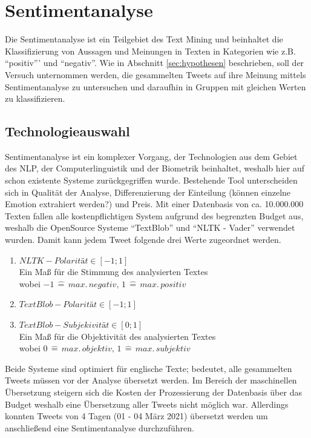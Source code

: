 \chapter{Sentimentanalyse}
\label{chap:sentiment}
Die Sentimentanalyse ist ein Teilgebiet des \gls{Text Mining} und beinhaltet die Klassifizierung von Aussagen und Meinungen in Texten in Kategorien wie z.B. "`positiv"'' und "`negativ"'\cite[S. 113]{python-sm-analysis}. Wie in Abschnitt \ref{sec:hypothesen} beschrieben, soll der Versuch unternommen werden, die gesammelten Tweets auf ihre Meinung mittels Sentimentanalyse zu untersuchen und daraufhin in Gruppen mit gleichen Werten zu klassifizieren. 
\section{Technologieauswahl}
\label{sec:Technologieauswahl}
Sentimentanalyse ist ein komplexer Vorgang, der Technologien aus dem Gebiet des \ac{NLP}, der Computerlinguistik und der Biometrik beinhaltet, weshalb hier auf schon existente Systeme zurückgegriffen wurde.
Bestehende Tool unterscheiden sich in Qualität der Analyse, Differenzierung der Einteilung (können einzelne Emotion extrahiert werden?) und Preis. 
Mit einer Datenbasis von ca. 10.000.000 Texten fallen alle kostenpflichtigen System aufgrund des begrenzten Budget aus, weshalb  die \gls{OpenSource} Systeme "`TextBlob"' und "`NLTK - Vader"' verwendet wurden. Damit kann jedem Tweet folgende drei Werte zugeordnet werden.
\begin{enumerate}
	\item $NLTK - Polarität \in [-1;1]$\\ Ein Maß für die Stimmung des analysierten Textes\\ wobei $-1\,\hat{=}\,max.\,negativ,\,1\,\hat{=} \,max.\,positiv$ 
	\item $TextBlob - Polarität \in [-1;1]$
	\item $TextBlob - Subjekivität \in [0;1]$\\ Ein Maß für die Objektivität des analysierten Textes\\ wobei $0\,\hat{=}\,max.\,objektiv,\,1\,\hat{=} \,max.\,subjektiv$ 
\end{enumerate}

Beide Systeme sind optimiert für englische Texte; bedeutet, alle gesammelten Tweets müssen vor der Analyse übersetzt werden. Im Bereich der maschinellen Übersetzung steigern sich die Kosten der Prozessierung der Datenbasis über das Budget weshalb eine Übersetzung aller Tweets nicht möglich war.
Allerdings konnten Tweets von 4 Tagen (01 - 04 März 2021)  übersetzt werden um anschließend eine Sentimentanalyse durchzuführen.

